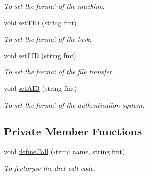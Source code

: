 \begin{DoxyCompactItemize}
\begin{DoxyCompactList}\small\item\em To set the format of the machine. \item\end{DoxyCompactList}\item 
\hypertarget{classObjectIdProxy_a99ab4e774c8bb1a175166081f02287bf}{
void \hyperlink{classObjectIdProxy_a99ab4e774c8bb1a175166081f02287bf}{setTID} (string fmt)}
\label{classObjectIdProxy_a99ab4e774c8bb1a175166081f02287bf}

\begin{DoxyCompactList}\small\item\em To set the format of the task. \item\end{DoxyCompactList}\item 
\hypertarget{classObjectIdProxy_a3d8750ae1b165e561543cc84403840c5}{
void \hyperlink{classObjectIdProxy_a3d8750ae1b165e561543cc84403840c5}{setFID} (string fmt)}
\label{classObjectIdProxy_a3d8750ae1b165e561543cc84403840c5}

\begin{DoxyCompactList}\small\item\em To set the format of the file transfer. \item\end{DoxyCompactList}\item 
\hypertarget{classObjectIdProxy_aed4ac129f0886836d97f3e9924fe479c}{
void \hyperlink{classObjectIdProxy_aed4ac129f0886836d97f3e9924fe479c}{setAID} (string fmt)}
\label{classObjectIdProxy_aed4ac129f0886836d97f3e9924fe479c}

\begin{DoxyCompactList}\small\item\em To set the format of the authentication system. \item\end{DoxyCompactList}\end{DoxyCompactItemize}
\subsection*{Private Member Functions}
\begin{DoxyCompactItemize}
\item 
\hypertarget{classObjectIdProxy_ac6e96fb0e849bafaf97ead83868d640e}{
void \hyperlink{classObjectIdProxy_ac6e96fb0e849bafaf97ead83868d640e}{defineCall} (string name, string fmt)}
\label{classObjectIdProxy_ac6e96fb0e849bafaf97ead83868d640e}

\begin{DoxyCompactList}\small\item\em To factoryze the diet call code. \item\end{DoxyCompactList}\end{DoxyCompactItemize}
